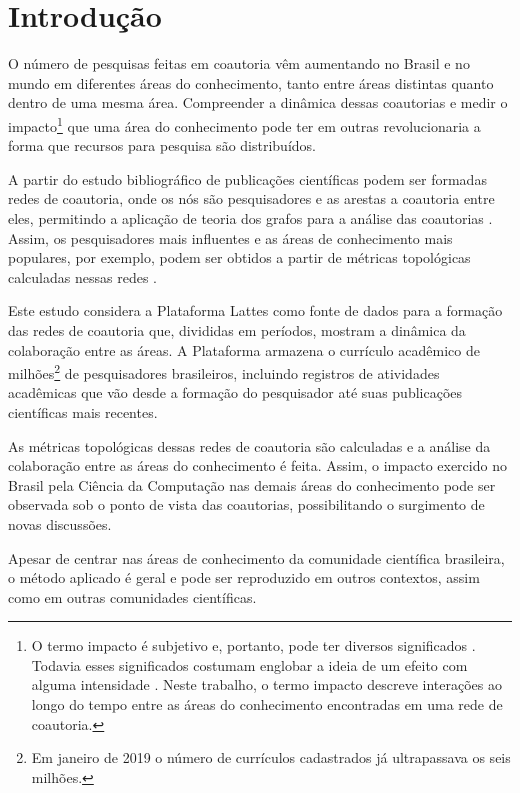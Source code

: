 \chapter[Introdução]{Introdução}

O número de pesquisas feitas em coautoria vêm aumentando no Brasil \cite{mena2014brazilian} e no mundo \cite{glanzel2003bibliometrics} em diferentes áreas do conhecimento, tanto entre áreas distintas quanto dentro de uma mesma área. Compreender a dinâmica dessas coautorias e medir o impacto\footnote{O termo impacto é subjetivo e, portanto, pode ter diversos significados \cite{roemer2015meaningful}. Todavia esses significados costumam englobar a ideia de um efeito com alguma intensidade \cite{roemer2015meaningful}. Neste trabalho, o termo impacto descreve interações ao longo do tempo entre as áreas do conhecimento encontradas em uma rede de coautoria.} que uma área do conhecimento pode ter em outras revolucionaria a forma que recursos para pesquisa são distribuídos.

A partir do estudo bibliográfico de publicações científicas podem ser formadas redes de coautoria, onde os nós são pesquisadores e as arestas a coautoria entre eles, permitindo a aplicação de teoria dos grafos para a análise das coautorias \cite{liu2005co}. Assim, os pesquisadores mais influentes e as áreas de conhecimento mais populares, por exemplo, podem ser obtidos a partir de métricas topológicas calculadas nessas redes \cite{franceschet2011collaboration}.

Este estudo considera a Plataforma Lattes como fonte de dados para a formação das redes de coautoria que, divididas em períodos, mostram a dinâmica da colaboração entre as áreas. A Plataforma armazena o currículo acadêmico de milhões\footnote{Em janeiro de 2019 o número de currículos cadastrados já ultrapassava os seis milhões.} de pesquisadores brasileiros, incluindo registros de atividades acadêmicas que vão desde a formação do pesquisador até suas publicações científicas mais recentes.

As métricas topológicas dessas redes de coautoria são calculadas e a análise da colaboração entre as áreas do conhecimento é feita. Assim, o impacto exercido no Brasil pela Ciência da Computação nas demais áreas do conhecimento pode ser observada sob o ponto de vista das coautorias, possibilitando o surgimento de novas discussões.

Apesar de centrar nas áreas de conhecimento da comunidade científica brasileira, o método aplicado é geral e pode ser reproduzido em outros contextos, assim como em outras comunidades científicas.

